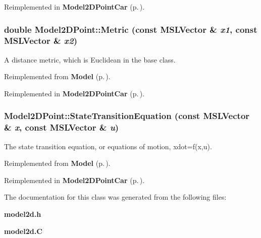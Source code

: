 Reimplemented in {\bf Model2DPoint\-Car} {\rm (p.\,\pageref{classModel2DPointCar_a2})}.
\subsubsection{\setlength{\rightskip}{0pt plus 5cm}double Model2DPoint::Metric (const {\bf MSLVector} \& {\em x1}, const {\bf MSLVector} \& {\em x2})\hspace{0.3cm}{\tt  [virtual]}}\label{classModel2DPoint_a4}


A distance metric, which is Euclidean in the base class.



Reimplemented from {\bf Model} {\rm (p.\,\pageref{classModel_a9})}.

Reimplemented in {\bf Model2DPoint\-Car} {\rm (p.\,\pageref{classModel2DPointCar_a4})}.
\subsubsection{ Model2DPoint::State\-Transition\-Equation (const {\bf MSLVector} \& {\em x}, const {\bf MSLVector} \& {\em u})\hspace{0.3cm}{\tt  [virtual]}}\label{classModel2DPoint_a3}


The state transition equation, or equations of motion, xdot=f(x,u).



Reimplemented from {\bf Model} {\rm (p.\,\pageref{classModel_a3})}.

Reimplemented in {\bf Model2DPoint\-Car} {\rm (p.\,\pageref{classModel2DPointCar_a3})}.

The documentation for this class was generated from the following files:\begin{CompactItemize}
\item 
{\bf model2d.h}\item 
{\bf model2d.C}\end{CompactItemize}
